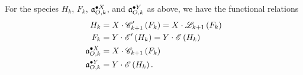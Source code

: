 \documentclass[sectionflow,singlespace,twoside,boldmathhdr]{brandiss} %
\numberwithin{section}{chapter}
\numberwithin{figure}{chapter}
\begin{document}
\begin{theorem}\label{thm:funcdecompco}
  For the species $H_{k}$, $F_{k}$, $\pointed[X]{\mathfrak{a}}_{O, k}$, and $\pointed[Y]{\mathfrak{a}}_{O, k}$ as above, we have the functional relations
  \begin{align}
    H_{k} &= X \cdot \specname{C}'_{k+1} \pbrac{F_{k}} = X \cdot \specname{L}_{k+1} \pbrac{F_{k}} \label{eq:hfuncorig} \\
    F_{k} &= Y \cdot \specname{E}' \pbrac{H_{k}} = Y \cdot \specname{E} \pbrac{H_{k}} \label{eq:ffuncorig} \\
    \pointed[X]{\mathfrak{a}}_{O, k} &= X \cdot \specname{C}_{k+1} \pbrac{F_{k}} \label{eq:axfuncorig} \\
    \pointed[Y]{\mathfrak{a}}_{O, k} &= Y \cdot \specname{E} \pbrac{H_{k}} \label{eq:ayfuncorig}.
  \end{align}
\end{theorem}

\begin{comment} The complete proof is now embedded in the exposition.
\begin{proof}
  It is clear from the exposition above that equations \eqref{eq:axfuncorig} and \eqref{eq:ayfuncorig} must hold for some appropriate species $F_{k}$ and $H_{k}$; a coherently-oriented $k$-tree rooted at a front requires only an $X$-label and a set of attached hedron structures, while one rooted at a hedron requires only a $Y$-label and a $\pbrac{k+1}$-cycle of front structures.

  Consider now the species $H_{k}$ of hedron structures adjoined to an existing front.
  The hedron itself needs an $X$-label, and in addition it requires a cyclically-ordered collection of fronts ($F_{k}$-structures).
  However, the front to which the hedron is attached is already labeled; thus, the collection of fronts \emph{not} already labeled has a $\specname{C}'_{k+1}$-structure, where the $'$ denotes the species derivative as in \cite[\S 1.4]{bll:species}.
  Accordingly, we obtain equation \eqref{eq:hfuncorig}.

  Equation \eqref{eq:ffuncorig} follows similarly, with the additional observation that the hedra attached to a given front have only the structure of a set.
  We also note that $\specname{E}' = \specname{E}$ and that $\specname{C}'_{k+1} = \specname{L}_{k}$ (the species of linear orderings of $k$ elements) to simplify future calculations.
\end{proof}
\end{comment}
\end{document}
